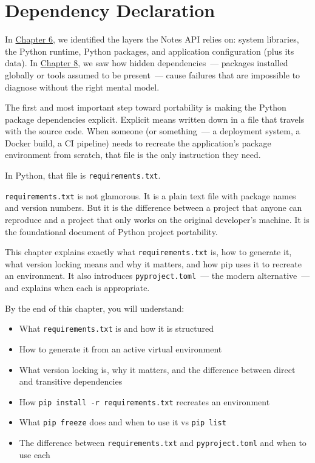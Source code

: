 \setcounter{chapter}{11}
\chapter{Dependency Declaration}\label{ch:12-dependency-declaration}

\chapterrule

In \hyperref[ch:06-local-dependencies]{Chapter 6}, we identified the layers the Notes API relies on: system libraries, the Python runtime, Python packages, and application configuration (plus its data). In \hyperref[ch:08-hidden-dependencies]{Chapter 8}, we saw how hidden dependencies~--- packages installed globally or tools assumed to be present~--- cause failures that are impossible to diagnose without the right mental model.

The first and most important step toward portability is making the Python package dependencies explicit. Explicit means written down in a file that travels with the source code. When someone (or something~--- a deployment system, a Docker build, a CI pipeline) needs to recreate the application's package environment from scratch, that file is the only instruction they need.

In Python, that file is \texttt{requirements.txt}.

\texttt{requirements.txt} is not glamorous. It is a plain text file with package names and version numbers. But it is the difference between a project that anyone can reproduce and a project that only works on the original developer's machine. It is the foundational document of Python project portability.

This chapter explains exactly what \texttt{requirements.txt} is, how to generate it, what version locking means and why it matters, and how pip uses it to recreate an environment. It also introduces \texttt{pyproject.toml}~--- the modern alternative~--- and explains when each is appropriate.

\begin{objectives}

By the end of this chapter, you will understand:

\begin{itemize}
\tightlist
\item
  What \texttt{requirements.txt} is and how it is structured
\item
  How to generate it from an active virtual environment
\item
  What version locking is, why it matters, and the difference between direct and transitive dependencies
\item
  How \texttt{pip\ install\ -}\allowbreak{}\texttt{r\ requirements.}\allowbreak{}\texttt{txt} recreates an environment
\item
  What \texttt{pip\ freeze} does and when to use it vs \texttt{pip\ list}
\item
  The difference between \texttt{requirements.txt} and \texttt{pyproject.toml} and when to use each
\end{itemize}

\end{objectives}

